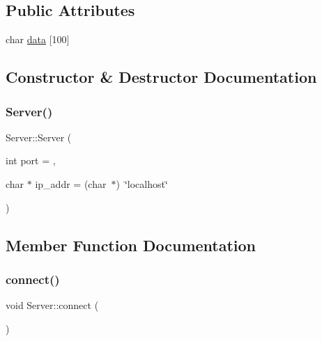\subsection*{Public Attributes}
\begin{DoxyCompactItemize}
\item 
char \hyperlink{classServer_a511bae2c5604c196eb714c798fdf709d}{data} \mbox{[}100\mbox{]}
\end{DoxyCompactItemize}


\subsection{Constructor \& Destructor Documentation}
\mbox{\label{classServer_a693b9b86cd9538ff4833a550515cabf8}} 
\subsubsection{\texorpdfstring{Server()}{Server()}}
{\footnotesize\ttfamily Server\+::\+Server (\begin{DoxyParamCaption}\item[{int}]{port = {},  }\item[{char $\ast$}]{ip\+\_\+addr = {\ttfamily (char~$\ast$)~\char`\"{}localhost\char`\"{}} }\end{DoxyParamCaption})}



\subsection{Member Function Documentation}
\mbox{\label{classServer_a0bd7069e79b4d5268f0947079e1af54a}} 
\subsubsection{\texorpdfstring{connect()}{connect()}}
{\footnotesize\ttfamily void Server\+::connect (\begin{DoxyParamCaption}{ }\end{DoxyParamCaption})}

\mbox{\label{classServer_acd0114484495cfd2749816ddb12e4246}} 

